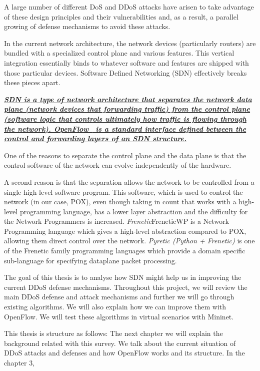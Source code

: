 \bigskip

A large number of different DoS and DDoS attacks have arisen to take advantage of these design principles and their vulnerabilities and, as a result, a parallel growing of defense mechanisms to avoid these attacks.
 
\par

In the current network architecture, the network devices (particularly routers) are bundled with a specialized control plane and various features. This vertical integration essentially binds to whatever software and features are shipped with those particular devices. Software Defined Networking (SDN) effectively breaks these pieces apart.

\par

\underline{\textit{\textbf{SDN is a type of network architecture that separates the network data plane (network devices that forwarding traffic) from the control plane (software logic that controls ultimately how traffic is flowing through the network). OpenFlow~\cite{OpenFlowWP} is a standard interface defined between the control and forwarding layers of an SDN structure. }}}

\par

One of the reasons to separate the control plane and the data plane is that the control software of the network can evolve independently of the hardware. 

\par

A second reason is that the separation allows the network to be controlled from a single high-level software program. This software, which is used to control the network (in our case, POX), even though taking in count that works with a high-level programming language, has a lower layer abstraction and the difficulty for the Network Programmers is increased. \textit{Frenetic}FreneticWP is a Network Programming language which gives a high-level abstraction compared to POX, allowing them direct control over the network. \textit{Pyretic (Python + Frenetic)} is one of the Frenetic family programming languages which provide a domain specific sub-language for specifying dataplane packet processing.

\par

The goal of this thesis is to analyse how SDN might help us in improving the current DDoS defense mechanisms. Throughout this project, we will review the main DDoS defense and attack mechanisms and further we will go through existing algorithms. We will also explain how we can improve them with OpenFlow. We will test these algorithms in virtual scenarios with Mininet.

\bigskip

This thesis is structure as follows: The next chapter we will explain the background related with this survey. We talk about the current situation of DDoS attacks and defenses and how OpenFlow works and its structure. In the chapter 3, 



